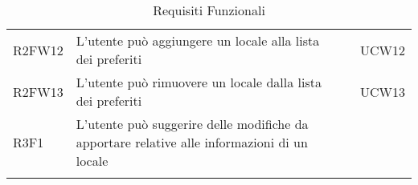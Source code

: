 \begin{longtable}{ m{}<{\centering}  m{}<{\centering}  m{}<{\centering}  m{}<{\centering}}
	R2FW12 & L’utente può aggiungere un locale alla lista dei preferiti & \De &  UCW12\\ 	 	 	

	R2FW13 & L’utente può rimuovere un locale dalla lista dei preferiti & \De & UCW13\\

	R3F1 & L’utente può suggerire delle modifiche da apportare relative alle informazioni di un locale & \Fa & \Di \\

	\hiderowcolors \caption{Requisiti Funzionali}
\end{longtable}

\clearpage